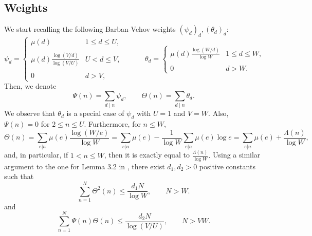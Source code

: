 \documentclass[reqno]{amsart}
\numberwithin{equation}{section}
\theoremstyle{remark}
\begin{document}
\subsection{Weights}
We start recalling the following Barban-Vehov weights $\left(\psi_d\right)_d,\left(\theta_d\right)_d$:
$$
\psi_d=\left\{\begin{array}{ll}
\mu(d) & 1 \leq d \leq U, \\ \\
\mu(d) \frac{\log (V / d)}{\log (V / U)} & U<d \leq V, \\ \\
0 & d>V,
\end{array} \right.
\qquad\quad\theta_d=\left\{\begin{array}{ll}
\mu(d) \frac{\log (W / d)}{\log W} & 1 \leq d \leq W, \\ \\
0 & d>W.
\end{array}\right.$$
Then, we denote
\begin{equation}\label{definepsisquare}
    \Psi(n)=\sum_{d \mid n} \psi_d,\qquad \Theta(n)=\sum_{d \mid n} \theta_d.
\end{equation}
We observe that $\theta_d$ is a special case of $\psi_d$ with $U=1$ and $V=W$. Also, $\Psi(n)=0$ for $2\le n\le U$. Furthermore, for $n\le W$,
\begin{equation}\label{thetaaslambda}
   \Theta(n) = \sum_{e | n}\mu(e)\frac{\log(W/e)}{\log W} = \sum_{e|n}\mu(e)-\frac{1}{\log W}\sum_{e|n}\mu(e)\log e=\sum_{e|n}\mu(e)+\frac{\Lambda(n)}{\log W} ,
\end{equation}
and, in particular, if $ 1<n\le W$, then it is exactly equal to $\frac{\Lambda(n)}{\log W}.$ Using a similar argument to the one for Lemma 3.2 in \cite{BELLOTTIlogfree}, there exist $d_1,d_2>0$ positive constants such that
\begin{equation}\label{constd1}
     \sum_{n=1}^N\Theta^2(n)\le \frac{d_1N}{\log W},\qquad N>W.
\end{equation}
and
\begin{equation}\label{constd2}
     \sum_{n=1}^N\Psi(n)\Theta(n)\le \frac{d_2N}{\log (V/U)},\qquad N>VW.
\end{equation}
\end{document}
